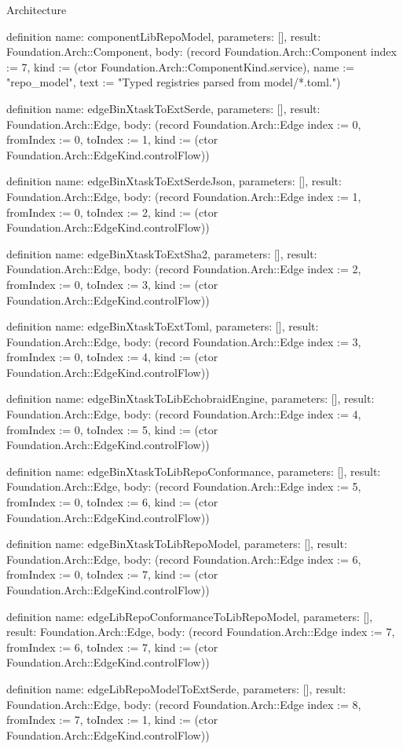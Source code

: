 \begin{lexlean}{Architecture}
\begin{semanticmodule}
definition{
  name: componentLibRepoModel,
  parameters: [],
  result: Foundation.Arch::Component,
  body: (record Foundation.Arch::Component {index := 7, kind := (ctor Foundation.Arch::ComponentKind.service), name := "repo_model", text := "Typed registries parsed from model/*.toml."})
}

definition{
  name: edgeBinXtaskToExtSerde,
  parameters: [],
  result: Foundation.Arch::Edge,
  body: (record Foundation.Arch::Edge {index := 0, fromIndex := 0, toIndex := 1, kind := (ctor Foundation.Arch::EdgeKind.controlFlow)})
}

definition{
  name: edgeBinXtaskToExtSerdeJson,
  parameters: [],
  result: Foundation.Arch::Edge,
  body: (record Foundation.Arch::Edge {index := 1, fromIndex := 0, toIndex := 2, kind := (ctor Foundation.Arch::EdgeKind.controlFlow)})
}

definition{
  name: edgeBinXtaskToExtSha2,
  parameters: [],
  result: Foundation.Arch::Edge,
  body: (record Foundation.Arch::Edge {index := 2, fromIndex := 0, toIndex := 3, kind := (ctor Foundation.Arch::EdgeKind.controlFlow)})
}

definition{
  name: edgeBinXtaskToExtToml,
  parameters: [],
  result: Foundation.Arch::Edge,
  body: (record Foundation.Arch::Edge {index := 3, fromIndex := 0, toIndex := 4, kind := (ctor Foundation.Arch::EdgeKind.controlFlow)})
}

definition{
  name: edgeBinXtaskToLibEchobraidEngine,
  parameters: [],
  result: Foundation.Arch::Edge,
  body: (record Foundation.Arch::Edge {index := 4, fromIndex := 0, toIndex := 5, kind := (ctor Foundation.Arch::EdgeKind.controlFlow)})
}

definition{
  name: edgeBinXtaskToLibRepoConformance,
  parameters: [],
  result: Foundation.Arch::Edge,
  body: (record Foundation.Arch::Edge {index := 5, fromIndex := 0, toIndex := 6, kind := (ctor Foundation.Arch::EdgeKind.controlFlow)})
}

definition{
  name: edgeBinXtaskToLibRepoModel,
  parameters: [],
  result: Foundation.Arch::Edge,
  body: (record Foundation.Arch::Edge {index := 6, fromIndex := 0, toIndex := 7, kind := (ctor Foundation.Arch::EdgeKind.controlFlow)})
}

definition{
  name: edgeLibRepoConformanceToLibRepoModel,
  parameters: [],
  result: Foundation.Arch::Edge,
  body: (record Foundation.Arch::Edge {index := 7, fromIndex := 6, toIndex := 7, kind := (ctor Foundation.Arch::EdgeKind.controlFlow)})
}

definition{
  name: edgeLibRepoModelToExtSerde,
  parameters: [],
  result: Foundation.Arch::Edge,
  body: (record Foundation.Arch::Edge {index := 8, fromIndex := 7, toIndex := 1, kind := (ctor Foundation.Arch::EdgeKind.controlFlow)})
}


\end{semanticmodule}
\end{lexlean}
